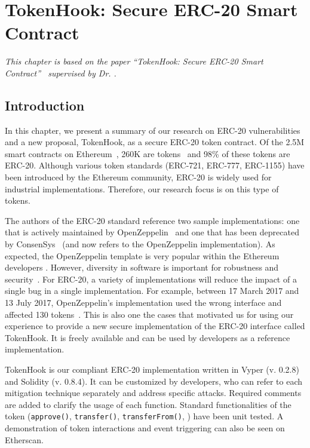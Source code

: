 
\chapter{TokenHook: Secure ERC-20 Smart Contract}\label{ch:tokenhook}

\textit{This chapter is based on the paper ``TokenHook: Secure ERC-20 Smart Contract''~\cite{token2021} supervised by Dr. \supv.}
	
\section{Introduction}
In this chapter, we present a summary of our research on ERC-20 vulnerabilities and a new proposal, TokenHook, as a secure ERC-20 token contract. Of the 2.5M smart contracts on Ethereum~\cite{Alethio}, 260K are tokens~\cite{TokenTracker} and 98\% of these tokens are ERC-20. Although various token standards (\eg ERC-721, ERC-777, ERC-1155) have been introduced by the Ethereum community, ERC-20 is widely used for industrial implementations. Therefore, our research focus is on this type of tokens.

The authors of the ERC-20 standard reference two sample implementations: one that is actively maintained by OpenZeppelin~\cite{OpenZeppelin_Token} and one that has been deprecated by ConsenSys~\cite{ConsenSys_Token} (and now refers to the OpenZeppelin implementation). As expected, the OpenZeppelin template is very popular within the Ethereum developers \cite{OpenZeppelin1,OpenZeppelin2,OpenZeppelin3}. However, diversity in software is important for robustness and security~\cite{FSA97,FHS97}. For ERC-20, a variety of implementations will reduce the impact of a single bug in a single implementation. For example, between 17 March 2017 and 13 July 2017, OpenZeppelin's implementation used the wrong interface and affected 130 tokens~\cite{TokenBug}. This is also one the cases that motivated us for using our experience to provide a new secure implementation of the ERC-20 interface called TokenHook. It is freely available and can be used by developers as a reference implementation.

TokenHook is our compliant ERC-20 implementation written in Vyper (v. 0.2.8) and Solidity (v. 0.8.4). It can be customized by developers, who can refer to each mitigation technique separately and address specific attacks. Required comments are added to clarify the usage of each function. Standard functionalities of the token (\ie \texttt{approve()}, \texttt{transfer()}, \texttt{transferFrom()}, \etc) have been unit tested. A demonstration of token interactions and event triggering can also be seen on Etherscan. 

